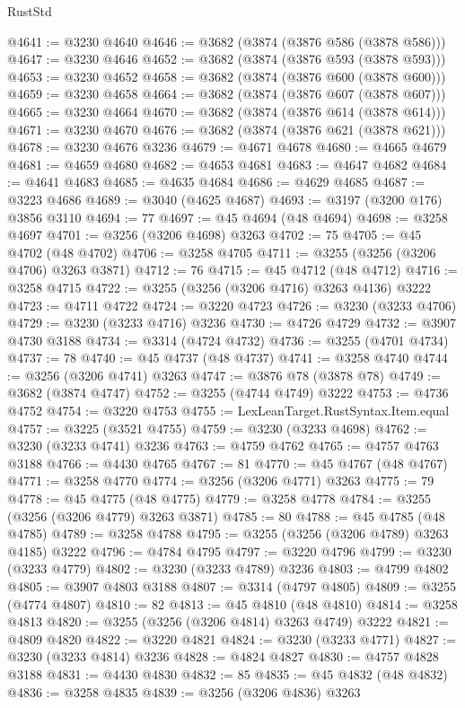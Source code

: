 \begin{lexlean}{RustStd}
\begin{coremodule}
@4641 := @3230 @4640
@4646 := @3682 (@3874 (@3876 @586 (@3878 @586)))
@4647 := @3230 @4646
@4652 := @3682 (@3874 (@3876 @593 (@3878 @593)))
@4653 := @3230 @4652
@4658 := @3682 (@3874 (@3876 @600 (@3878 @600)))
@4659 := @3230 @4658
@4664 := @3682 (@3874 (@3876 @607 (@3878 @607)))
@4665 := @3230 @4664
@4670 := @3682 (@3874 (@3876 @614 (@3878 @614)))
@4671 := @3230 @4670
@4676 := @3682 (@3874 (@3876 @621 (@3878 @621)))
@4678 := @3230 @4676 @3236
@4679 := @4671 @4678
@4680 := @4665 @4679
@4681 := @4659 @4680
@4682 := @4653 @4681
@4683 := @4647 @4682
@4684 := @4641 @4683
@4685 := @4635 @4684
@4686 := @4629 @4685
@4687 := @3223 @4686
@4689 := @3040 (@4625 @4687)
@4693 := @3197 (@3200 @176) @3856 @3110
@4694 := 77
@4697 := @45 @4694 (@48 @4694)
@4698 := @3258 @4697
@4701 := @3256 (@3206 @4698) @3263
@4702 := 75
@4705 := @45 @4702 (@48 @4702)
@4706 := @3258 @4705
@4711 := @3255 (@3256 (@3206 @4706) @3263 @3871)
@4712 := 76
@4715 := @45 @4712 (@48 @4712)
@4716 := @3258 @4715
@4722 := @3255 (@3256 (@3206 @4716) @3263 @4136) @3222
@4723 := @4711 @4722
@4724 := @3220 @4723
@4726 := @3230 (@3233 @4706)
@4729 := @3230 (@3233 @4716) @3236
@4730 := @4726 @4729
@4732 := @3907 @4730 @3188
@4734 := @3314 (@4724 @4732)
@4736 := @3255 (@4701 @4734)
@4737 := 78
@4740 := @45 @4737 (@48 @4737)
@4741 := @3258 @4740
@4744 := @3256 (@3206 @4741) @3263
@4747 := @3876 @78 (@3878 @78)
@4749 := @3682 (@3874 @4747)
@4752 := @3255 (@4744 @4749) @3222
@4753 := @4736 @4752
@4754 := @3220 @4753
@4755 := LexLeanTarget.RustSyntax.Item.equal
@4757 := @3225 (@3521 @4755)
@4759 := @3230 (@3233 @4698)
@4762 := @3230 (@3233 @4741) @3236
@4763 := @4759 @4762
@4765 := @4757 @4763 @3188
@4766 := @4430 @4765
@4767 := 81
@4770 := @45 @4767 (@48 @4767)
@4771 := @3258 @4770
@4774 := @3256 (@3206 @4771) @3263
@4775 := 79
@4778 := @45 @4775 (@48 @4775)
@4779 := @3258 @4778
@4784 := @3255 (@3256 (@3206 @4779) @3263 @3871)
@4785 := 80
@4788 := @45 @4785 (@48 @4785)
@4789 := @3258 @4788
@4795 := @3255 (@3256 (@3206 @4789) @3263 @4185) @3222
@4796 := @4784 @4795
@4797 := @3220 @4796
@4799 := @3230 (@3233 @4779)
@4802 := @3230 (@3233 @4789) @3236
@4803 := @4799 @4802
@4805 := @3907 @4803 @3188
@4807 := @3314 (@4797 @4805)
@4809 := @3255 (@4774 @4807)
@4810 := 82
@4813 := @45 @4810 (@48 @4810)
@4814 := @3258 @4813
@4820 := @3255 (@3256 (@3206 @4814) @3263 @4749) @3222
@4821 := @4809 @4820
@4822 := @3220 @4821
@4824 := @3230 (@3233 @4771)
@4827 := @3230 (@3233 @4814) @3236
@4828 := @4824 @4827
@4830 := @4757 @4828 @3188
@4831 := @4430 @4830
@4832 := 85
@4835 := @45 @4832 (@48 @4832)
@4836 := @3258 @4835
@4839 := @3256 (@3206 @4836) @3263

\end{coremodule}
\end{lexlean}
